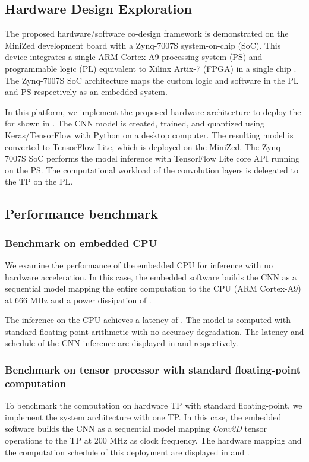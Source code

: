 \subsection{Hardware Design Exploration}
The proposed hardware/software co-design framework is demonstrated on the MiniZed development board with a Zynq-7007S system-on-chip (SoC). This device integrates a single ARM Cortex-A9 processing system (PS) and programmable logic (PL) equivalent to Xilinx Artix-7 (FPGA) in a single chip \cite{xilinx2015zynq}. The Zynq-7007S SoC architecture maps the custom logic and software in the PL and PS respectively as an embedded system.

In this platform, we implement the proposed hardware architecture to deploy the  for  shown in . The CNN model is created, trained, and quantized using Keras/TensorFlow with Python on a desktop computer. The resulting model is converted to TensorFlow Lite, which is deployed on the MiniZed. The Zynq-7007S SoC performs the model inference with TensorFlow Lite core API running on the PS. The computational workload of the convolution layers is delegated to the TP on the PL.

\subsection{Performance benchmark}
\subsubsection{Benchmark on embedded CPU}

We examine the performance of the embedded CPU for inference with no hardware acceleration. In this case, the embedded software builds the CNN as a sequential model mapping the entire computation to the CPU (ARM Cortex-A9) at 666 MHz and a power dissipation of .

The inference on the CPU achieves a latency of . The model is computed with standard floating-point arithmetic with no accuracy degradation. The latency and schedule of the CNN inference are displayed in  and  respectively.

\subsubsection{Benchmark on tensor processor with standard floating-point computation}
To benchmark the computation on hardware TP with standard floating-point, we implement the system architecture with one TP. In this case, the embedded software builds the CNN as a sequential model mapping \emph{Conv2D} tensor operations to the TP at 200 MHz as clock frequency. The hardware mapping and the computation schedule of this deployment are displayed in  and .

